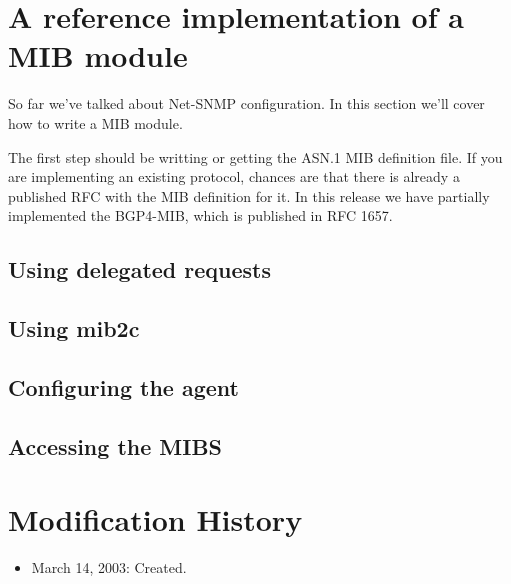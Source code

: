 \documentclass[11pt]{article}
\begin{document}
\section{A reference implementation of a MIB module}

So far we've talked about Net-SNMP configuration.  In this section we'll cover how to write a MIB module.  

The first step should be writting or getting the ASN.1 MIB definition file.  If you are implementing an existing protocol, chances are that there is already a published RFC with the MIB definition for it.  In this release we have partially implemented the BGP4-MIB, which is published in RFC 1657.

\subsection{Using delegated requests}
\subsection{Using mib2c}
\subsection{Configuring the agent}
\subsection{Accessing the MIBS}

\appendix
\section{Modification History}

\begin{itemize}

  \item March 14, 2003: Created.

\end{itemize}




\end{document}
